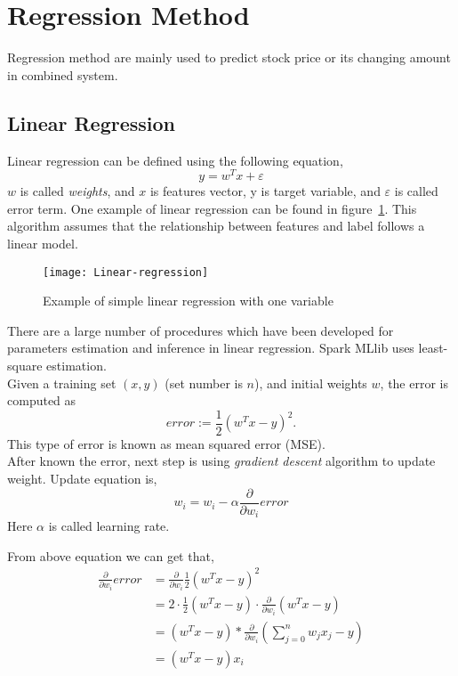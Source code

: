 \section{Regression Method}
Regression method are mainly used to predict stock price or its changing amount in combined system.

\subsection{Linear Regression}
Linear regression can be defined using the following equation,
\begin{equation}
	y=w^Tx + \varepsilon
\end{equation}
$ w $ is called \emph{weights}, and $ x $ is features vector, y is target variable, and $ \varepsilon $ is called error term. One example of linear regression can be found in figure~\ref{fg:linear_regression}. This algorithm assumes that the relationship between features and label follows a linear model.
\begin{figure}[h]
	\centering
	\texttt{[image: Linear-regression]}
	\caption{Example of simple linear regression with one variable}
	\label{fg:linear_regression}
\end{figure}


There are a large number of procedures which have been developed for parameters estimation and inference in linear regression. Spark MLlib uses least-square estimation\cite{7_mllib_linear_methods}.\\


Given a training set $ (x, y) $ (set number is $ n $), and initial weights $ w $, the error is computed as
\begin{equation}
error := \frac{1}{2} (w^T x - y)^2.
\label{eq:error_equation}
\end{equation}
This type of error is known as mean squared error (MSE).\\


After known the error, next step is using \emph{gradient descent} algorithm to update weight. Update equation is,
\begin{equation}
w_i=w_i-\alpha \frac{\partial}{\partial w_i} error
\label{eq:update_equation}
\end{equation}
Here $ \alpha $ is called learning rate. 


From above equation we can get that,
\begin{equation}
\begin{split}
\frac{\partial }{\partial w_i} error & = \frac{\partial }{\partial w_i} \frac{1}{2}(w^Tx-y)^2\\
& = 2 \cdot \frac{1}{2} (w^Tx-y) \cdot \frac{\partial }{\partial w_i} (w^Tx-y)\\
& = (w^Tx-y) * \frac{\partial }{\partial w_i} (\sum_{j=0}^{n}w_j x_j - y)\\
& = (w^Tx-y)x_i
\end{split}
\label{eq:partil_error}
\end{equation}


